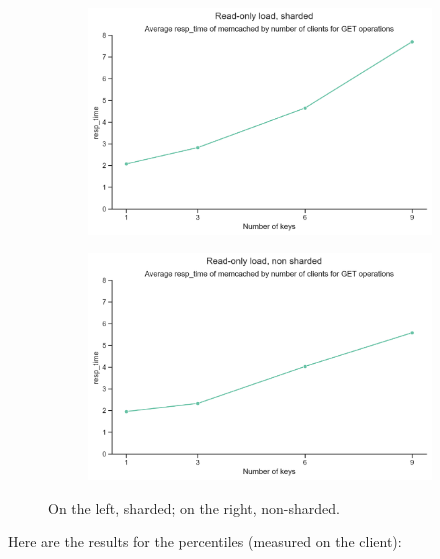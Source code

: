 \documentclass[11pt,a4paper]{article}
\begin{document}
\begin{figure}[H]
	\begin{subfigure}[b]{0.5\linewidth}
		\includegraphics[width=\linewidth]{images/gets_2/average_resp_time.pdf}
	\end{subfigure}
	\begin{subfigure}[b]{0.5\linewidth}
		\includegraphics[width=\linewidth]{images/gets_1/average_resp_time.pdf}
	\end{subfigure}
	\caption{On the left, sharded; on the right, non-sharded.}
	\label{fig:averages}
\end{figure}


Here are the results for the percentiles (measured on the client):
\end{document}
